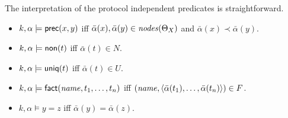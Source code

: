 \documentclass[12pt]{report}
\theoremstyle{definition}
\newcommand{\nodes}{\fn{nodes}}
\begin{document}
The interpretation of the protocol independent predicates is
straightforward.
\begin{itemize}
\item $k,\alpha\models\operatorname{\mathsf{prec}}(x, y)$ iff
  $\bar\alpha(x),\bar\alpha(y)\in\nodes(\Theta_X)$ and
  $\bar\alpha(x)\prec\bar\alpha(y)$.
\item $k,\alpha\models\operatorname{\mathsf{non}}(t)$ iff $\bar\alpha(t)\in N$.
\item $k,\alpha\models\operatorname{\mathsf{uniq}}(t)$ iff $\bar\alpha(t)\in U$.
\item $k,\alpha\models\operatorname{\mathsf{fact}}(\operatorname{\mathit{name}}, t_1,\ldots,t_n)$ iff
  $(\operatorname{\mathit{name}},\langle\bar\alpha(t_1),\ldots,\bar\alpha(t_n)\rangle)
  \in F$.
\item $k,\alpha\models y=z$ iff $\bar\alpha(y)=\bar\alpha(z)$.
\end{itemize}




\printindex
\end{document}
